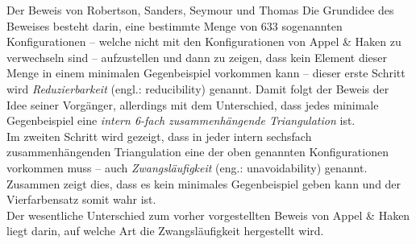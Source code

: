 \begin{chapter}{Der Beweis von Robertson, Sanders, Seymour und Thomas}
  Die Grundidee des Beweises besteht darin, eine bestimmte Menge von 633 sogenannten Konfigurationen -- welche nicht mit den Konfigurationen von Appel \& Haken zu verwechseln sind -- aufzustellen und dann zu zeigen, dass kein Element dieser Menge in einem minimalen Gegenbeispiel vorkommen kann -- dieser erste Schritt wird \textit{Reduzierbarkeit} (engl.: reducibility) genannt. Damit folgt der Beweis der Idee seiner Vorgänger, allerdings mit dem Unterschied, dass jedes minimale Gegenbeispiel eine \textit{intern 6-fach zusammenhängende Triangulation} ist. \\
  Im zweiten Schritt wird gezeigt, dass in jeder intern sechsfach zusammenhängenden Triangulation eine der oben genannten Konfigurationen vorkommen muss -- auch \textit{Zwangsläufigkeit} (eng.: unavoidability) genannt. Zusammen zeigt dies, dass es kein minimales Gegenbeispiel geben kann und der Vierfarbensatz somit wahr ist. \\
  Der wesentliche Unterschied zum vorher vorgestellten Beweis von Appel \& Haken liegt darin, auf welche Art die Zwangsläufigkeit hergestellt wird.
  
  
  
\end{chapter}
